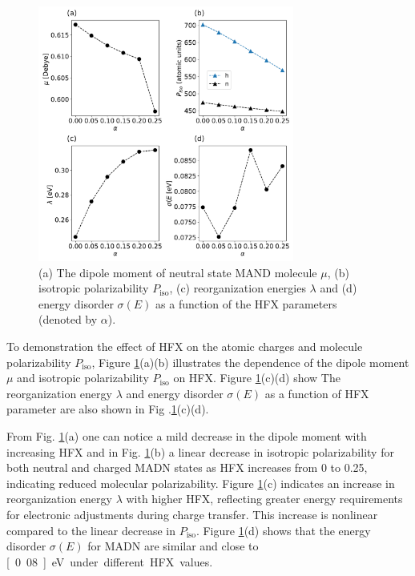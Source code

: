 \documentclass[letterpaper,12pt]{article}
\begin{document}
%
\begin{figure}[H]
    \centering
    \includegraphics[width=0.75\textwidth]{figs/fig_autogen.pdf}
    \caption{(a) The dipole moment of neutral state MAND molecule $\mu$, (b) isotropic polarizability $P_\text{iso}$, (c) reorganization energies $\lambda$ and (d) energy disorder $\sigma(E)$ as a function of the HFX parameters (denoted by $\alpha$).}
    \label{fig:autogen_MADN}
\end{figure}
% 

To demonstration the effect of HFX on the atomic charges and molecule polarizability $P_\text{iso}$,
Figure \ref{fig:autogen_MADN}(a)(b) illustrates the dependence of the dipole moment $\mu$ and isotropic polarizability $P_\text{iso}$ on HFX.
Figure \ref{fig:autogen_MADN}(c)(d) show 
The reorganization energy $\lambda$ and energy disorder $\sigma(E)$ as a function of HFX parameter are also shown in Fig .\ref{fig:autogen_MADN}(c)(d).

From Fig. \ref{fig:autogen_MADN}(a) one can notice a mild decrease in the dipole moment with increasing HFX and in Fig. \ref{fig:autogen_MADN}(b) a linear decrease in isotropic polarizability for both neutral and charged MADN states as HFX increases from 0 to 0.25, indicating reduced molecular polarizability.
Figure \ref{fig:autogen_MADN}(c) indicates an increase in reorganization energy $\lambda$ with higher HFX, reflecting greater energy requirements for electronic adjustments during charge transfer. This increase is nonlinear compared to the linear decrease in $P_\text{iso}$.
Figure \ref{fig:autogen_MADN}(d) shows that the energy disorder $\sigma(E)$ for MADN are similar and close to \unit[0.08]{eV} under different HFX values.
\end{document}
